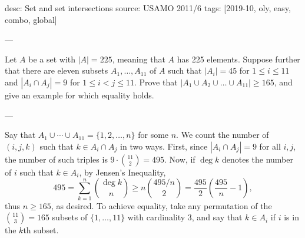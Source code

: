 desc: Set and set intersections
source: USAMO 2011/6
tags: [2019-10, oly, easy, combo, global]

---

Let $A$ be a set with $|A|=225$, meaning that $A$ has 225 elements. Suppose further that there are eleven subsets $A_1, \ldots, A_{11}$ of $A$ such that $|A_i|=45$ for $1\le i\le11$ and $|A_i\cap A_j|=9$ for $1\le i<j\le11$. Prove that $|A_1\cup A_2\cup\ldots\cup A_{11}|\ge165$, and give an example for which equality holds.

---

Say that $A_1\cup\cdots\cup A_{11}=\{1,2,\ldots,n\}$ for some $n$. We count the number of $(i,j,k)$ such that $k\in A_i\cap A_j$ in two ways. First, since $|A_i\cap A_j|=9$ for all $i,j$, the number of such triples is $9\cdot\binom{11}2=495$. Now, if $\deg k$ denotes the number of $i$ such that $k\in A_i$, by Jensen's Inequality, \[495=\sum_{k=1}^n\binom{\deg k}n\ge n\binom{495/n}2=\frac{495}2\left(\frac{495}n-1\right),\]
thus $n\ge165$, as desired. To achieve equality, take any permutation of the $\binom{11}3=165$ subsets of $\{1,\ldots,11\}$ with cardinality $3$, and say that $k\in A_i$ if $i$ is in the $k$th subset.
